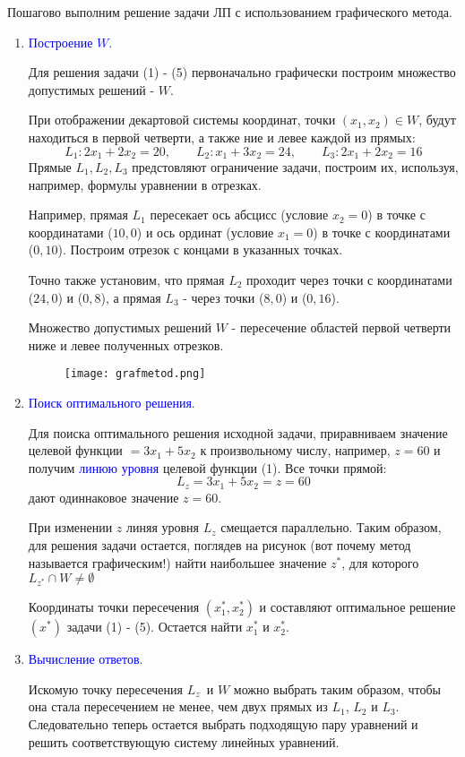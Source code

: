 \documentclass[14pt, letterpaper]{article}
\begin{document}
Пошагово выполним решение задачи ЛП с использованием графического метода.
\begin{enumerate}
    \item \textcolor{blue}{Построение $W$.}
    
    Для решения задачи (1) - (5) первоначально графически построим множество допустимых решений - $W$.
    
При отображении декартовой системы координат, точки $(x_{1}, x_{2}) \in W$, будут находиться в первой четверти, а также ние и левее каждой из прямых:
$$L_{1}: 2x_{1} + 2x_{2} = 20,\qquad  L_{2}: x_{1} + 3x_{2} = 24,\qquad  L_{3}: 2x_{1} + 2x_{2} = 16$$
Прямые $L_{1}, L_{2}, L_{3}$ предстовляют ограничение задачи, построим их, используя, например, формулы уравнении в отрезках.


    Например, прямая $L_{1}$ пересекает ось абсцисс (условие $x_{2} = 0$) в точке с координатами ($10, 0$) и ось ординат (условие $x_{1} = 0$) в точке с координатами ($0, 10$). Построим отрезок с концами в указанных точках. 

    Точно также установим, что прямая $L_{2}$ проходит через точки с координатами ($24, 0$) и ($0, 8$), а прямая $L_{3}$ - через точки ($8, 0$) и ($0, 16$).

    Множество допустимых решений $W$ - пересечение областей первой четверти ниже и левее полученных отрезков.
    \begin{figure}[h]
    \centering       
    \texttt{[image: grafmetod.png]}        
    \end{figure}
        
    \item \textcolor{blue}{Поиск оптимального решения.}
    
    Для поиска оптимального решения исходной задачи, приравниваем значение целевой функции $= 3x_{1} + 5x_{2}$ к произвольному числу, например, $z = 60$ и получим \textcolor{blue}{линюю уровня} целевой функции (1). Все точки прямой: 
    $$L_{z} = 3x_{1} + 5x_{2} = z = 60 $$
    дают одиннаковое значение $z = 60$.

    При изменении $z$ линяя уровня $L_{z}$ смещается параллельно.
    Таким образом, для решения задачи остается, поглядев на рисунок (вот почему метод называется графическим!) найти наибольшее значение $z^{*}$, для которого $L_{z^{*}} \cap W \neq \emptyset$

    Координаты точки пересечения $(x_{1}^{*}, x_{2}^{*})$ и составляют оптимальное решение $(x^{*})$ задачи (1) - (5). Остается найти $x_{1}^{*}$ и $x_{2}^{*}$.
    
    \item \textcolor{blue}{Вычисление ответов.}

    Искомую точку пересечения $L_{z^{ \cdot }}$ и $W$ можно выбрать таким образом, чтобы она стала пересечением не менее, чем двух прямых из $L_{1}$, $L_{2}$ и $L_{3}$. Следовательно теперь остается выбрать подходящую пару уравнений и решить соответствующую систему линейных уравнений.
\end{enumerate}
\end{document}
